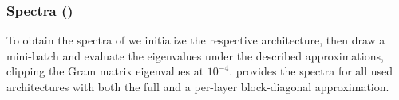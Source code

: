 \subsubsection{\ggn Spectra ()}

To obtain the spectra of  we initialize the
respective architecture, then draw a mini-batch and evaluate the \ggn
eigenvalues under the described approximations, clipping the Gram matrix
eigenvalues at $10^{-4}$.  provides the spectra for
all used architectures with both the full \ggn and a per-layer block-diagonal
approximation.



